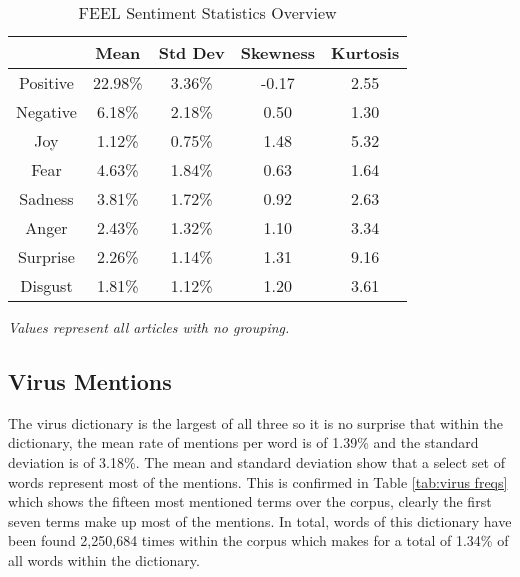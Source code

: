 \begin{table}[H]
\centering
\begin{tabular}{@{}ccccc@{}}
\toprule
         & Mean    & Std Dev & Skewness & Kurtosis \\ \midrule
Positive & 22.98\% & 3.36\%  & -0.17  & 2.55   \\
Negative & 6.18\%  & 2.18\%  & 0.50   & 1.30   \\
Joy      & 1.12\%  & 0.75\%  & 1.48   & 5.32   \\
Fear     & 4.63\%  & 1.84\%  & 0.63   & 1.64   \\
Sadness  & 3.81\%  & 1.72\%  & 0.92   & 2.63   \\
Anger    & 2.43\%  & 1.32\%  & 1.10   & 3.34   \\
Surprise & 2.26\%  & 1.14\%  & 1.31   & 9.16   \\
Disgust  & 1.81\%  & 1.12\%  & 1.20   & 3.61   \\
\bottomrule
\end{tabular}
\caption{FEEL Sentiment Statistics Overview}
\label{tab:feel stats}
\emph{Values represent all articles with no grouping.}
\end{table}

\subsection{Virus Mentions}

The virus dictionary is the largest of all three so it is no surprise that within the dictionary, the mean rate of mentions per word is of 1.39\% and the standard deviation is of 3.18\%. The mean and standard deviation show that a select set of words represent most of the mentions. This is confirmed in Table \ref{tab:virus freqs} which shows the fifteen most mentioned terms over the corpus, clearly the first seven terms make up most of the mentions. In total, words of this dictionary have been found 2,250,684 times within the corpus which makes for a total of 1.34\% of all words within the dictionary.

